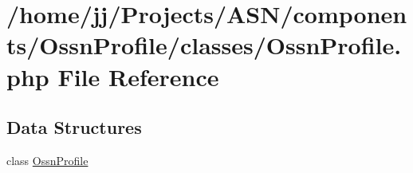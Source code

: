 \hypertarget{classes_2_ossn_profile_8php}{}\section{/home/jj/\+Projects/\+A\+S\+N/components/\+Ossn\+Profile/classes/\+Ossn\+Profile.php File Reference}
\label{classes_2_ossn_profile_8php}
\subsection*{Data Structures}
\begin{DoxyCompactItemize}
\item 
class \hyperlink{class_ossn_profile}{Ossn\+Profile}
\end{DoxyCompactItemize}
